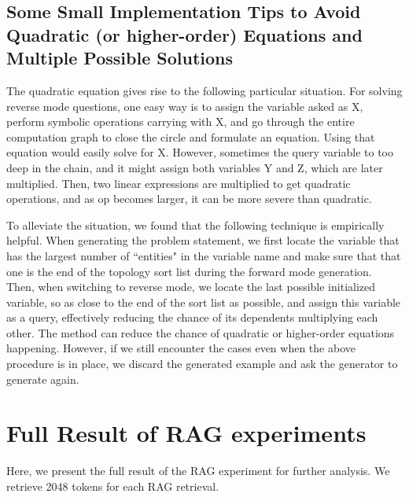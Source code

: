 \subsection{Some Small Implementation Tips to Avoid Quadratic (or higher-order) Equations and Multiple Possible Solutions} 
\label{sometips} 
The quadratic equation gives rise to the following particular situation. For solving reverse mode questions, one easy way is to assign the variable asked as X, perform symbolic operations carrying with X, and go through the entire computation graph to close the circle and formulate an equation. Using that equation would easily solve for X. However, sometimes the query variable to too deep in the chain, and it might assign both variables Y and Z, which are later multiplied. Then, two linear expressions are multiplied to get quadratic operations, and as op becomes larger, it can be more severe than quadratic. 

To alleviate the situation, we found that the following technique is empirically helpful. When generating the problem statement, we first locate the variable that has the largest number of ``entities" in the variable name and make sure that that one is the end of the topology sort list during the forward mode generation. Then, when switching to reverse mode, we locate the last possible initialized variable, so as close to the end of the sort list as possible, and assign this variable as a query, effectively reducing the chance of its dependents multiplying each other. The method can reduce the chance of quadratic or higher-order equations happening. However, if we still encounter the cases even when the above procedure is in place, we discard the generated example and ask the generator to generate again. 

\newpage 

\section{Full Result of RAG experiments}
\label{rag_full_result}
Here, we present the full result of the RAG experiment for further analysis. We retrieve 2048 tokens for each RAG retrieval.
